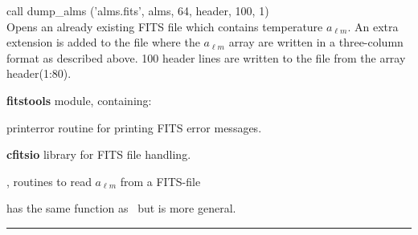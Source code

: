 \begin{example}
{
call dump\_alms ('alms.fits', alms, 64, header, 100, 1)  \\
}
{
Opens an already existing FITS file which contains temperature $a_{\ell m}$. An extra extension is added to the file where the $a_{\ell m}$ array are written in a three-column format as described above. 100 header lines are written to the file from the array header(1:80). 
}
\end{example}

\begin{modules}
  \begin{sulist}{} %
  \item[\textbf{fitstools}] module, containing:
  \item[printerror] routine for printing FITS error messages.
  \item[\textbf{cfitsio}] library for FITS file handling.		
  \end{sulist}
\end{modules}

\begin{related}
  \begin{sulist}{} %
  \item[\htmlref{fits2alms}{sub:fits2alms}, \htmlref{read\_conbintab}{sub:read_conbintab}] routines to read $a_{\ell m}$ from a FITS-file 
  \item[\htmlref{alms2fits}{sub:alms2fits}] has the same function as \thedocid\ but is more general.
  \end{sulist}
\end{related}

\rule{\hsize}{2mm}

\newpage
